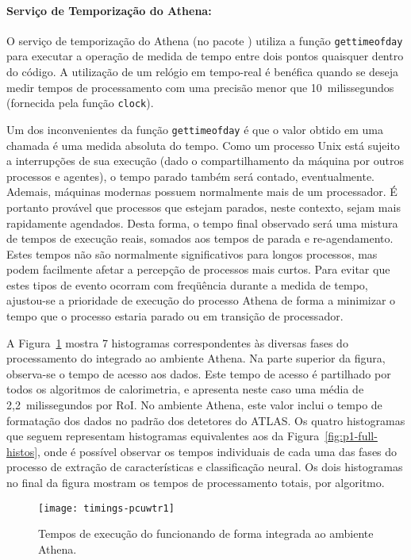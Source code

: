 \paragraph{Serviço de Temporização do Athena:} O serviço de temporização do
Athena (no pacote ) utiliza a função \texttt{gettimeofday}
\cite{web:gcc-libc} para executar a operação de medida de tempo entre dois
pontos quaisquer dentro do código. A utilização de um relógio em tempo-real é
benéfica quando se deseja medir tempos de processamento com uma precisão menor
que 10~milissegundos (fornecida pela função \texttt{clock}). 

Um dos inconvenientes da função \texttt{gettimeofday} é que o valor obtido em
uma chamada é uma medida absoluta do tempo. Como um processo Unix está sujeito
a interrupções de sua execução (dado o compartilhamento da máquina por outros
processos e agentes), o tempo parado também será contado,
eventualmente. Ademais, máquinas modernas possuem normalmente mais de um
processador. É portanto provável que processos que estejam parados, neste
contexto, sejam mais rapidamente agendados. Desta forma, o tempo final
observado será uma mistura de tempos de execução reais, somados aos tempos de
parada e re-agendamento. Estes tempos não são normalmente significativos para
longos processos, mas podem facilmente afetar a percepção de processos mais
curtos. Para evitar que estes tipos de evento ocorram com freqüência durante a
medida de tempo, ajustou-se a prioridade de execução do processo Athena de
forma a minimizar o tempo que o processo estaria parado ou em transição de
processador.

A Figura~\ref{fig:timings-athena} mostra 7 histogramas correspondentes às
diversas fases do processamento do  integrado ao ambiente
Athena. Na parte superior da figura, observa-se o tempo de acesso aos
dados. Este tempo de acesso é partilhado por todos os algoritmos de
calorimetria, e apresenta neste caso uma média de 2,2~milissegundos por
RoI. No ambiente Athena, este valor inclui o tempo de formatação dos dados no
padrão dos detetores do ATLAS. Os quatro histogramas que seguem representam
histogramas equivalentes aos da Figura~\ref{fig:p1-full-histos}, onde é
possível observar os tempos individuais de cada uma das fases do processo de
extração de características e classificação neural. Os dois histogramas no
final da figura mostram os tempos de processamento totais, por algoritmo.

\begin{figure}
\begin{center}
\texttt{[image: timings-pcuwtr1]}
\end{center}
\caption{Tempos de execução do  funcionando de forma
integrada ao ambiente Athena.}
\label{fig:timings-athena}
\end{figure}

